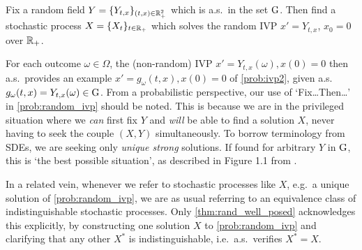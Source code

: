 \begin{problem}\label{prob:random_ivp}
    Fix a random field $Y=\{Y_{t,x}\}_{(t,x)\in\mathbb{R}^2_+}$ which is a.s.~in the set $\mathrm{G}$. Then find a stochastic process $X=\{X_t\}_{t\in\mathbb{R}_+}$ which solves the random IVP $x'=Y_{t,x}$, $x_0=0$ over $\mathbb{R}_+$.
\end{problem}

For each outcome $\omega\in\Omega$, the (non-random) IVP $x'=Y_{t,x}(\omega), x(0)=0$ then a.s.~provides an example $x'=g_\omega(t,x), x(0)=0$ of \autoref{prob:ivp2}, given a.s.~$g_\omega(t,x)=Y_{t,x}(\omega)\in\mathrm{G}$. From a probabilistic perspective, our use of `Fix\dots Then\dots' in \autoref{prob:random_ivp} should be noted. This is because we are in the privileged situation where we \emph{can} first fix $Y$ and \emph{will} be able to find a solution $X$, never having to seek the couple $(X,Y)$ simultaneously. To borrow terminology from SDEs, we are seeking only \emph{unique strong} solutions. If found for arbitrary $Y$ in $\mathrm{G}$, this is `the best possible situation', as described in Figure 1.1 from \cite{cherny_2005}.

In a related vein, whenever we refer to stochastic processes like $X$, e.g.~a unique solution of \autoref{prob:random_ivp}, we are as usual referring to an equivalence class of indistinguishable stochastic processes. Only \autoref{thm:rand_well_posed} acknowledges this explicitly, by constructing one solution $X$ to \autoref{prob:random_ivp} and clarifying that any other $X^*$ is indistinguishable, i.e.~a.s.~verifies $X^*=X$.

